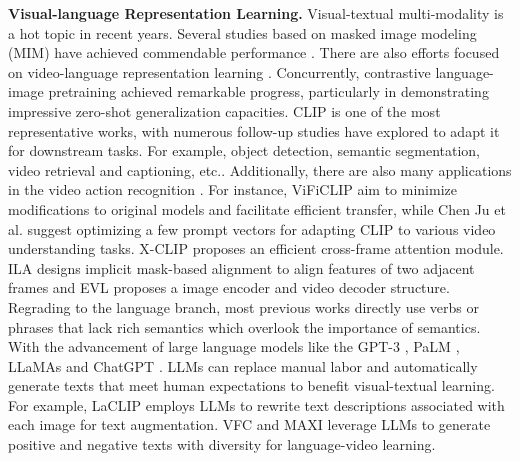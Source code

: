 \noindent
\textbf{Visual-language Representation Learning.} Visual-textual multi-modality is a hot topic in recent years. Several studies based on masked image modeling (MIM) have achieved commendable performance \cite{li2020unicoder,lu2019vilbert,su2019vl,tan2019lxmert}. There are also efforts focused on video-language representation learning \cite{miech2019howto100m,sun2019learning,sun2019videobert,zhu2020actbert,xu2021videoclip}. Concurrently, contrastive language-image pretraining \cite{radford2021learning,jia2021scaling,yuan2021florence} achieved remarkable progress, particularly in demonstrating impressive zero-shot generalization capacities. CLIP \cite{radford2021learning} is one of the most representative works, with numerous follow-up studies have explored to adapt it for downstream tasks. For example, object detection, semantic segmentation, video retrieval and captioning, etc.\cite{gu2021open,vinker2022clipasso,li2022grounded,luo2022clip4clip,xu2022groupvit}. Additionally, there are also many applications in the video action recognition \cite{wang2021actionclip,ni2022expanding,lin2022frozen,ju2022prompting,pan2022st,rasheed2023fine,chen2023video,tu2023implicit,lin2023match,momeni2023verbs,yang2023aim}. For instance, ViFiCLIP \cite{rasheed2023fine} aim to minimize modifications to original models and facilitate efficient transfer, while Chen Ju et al. \cite{ju2022prompting} suggest optimizing a few prompt vectors for adapting CLIP to various video understanding tasks. X-CLIP \cite{ni2022expanding} proposes an efficient cross-frame attention module. ILA \cite{tu2023implicit} designs implicit mask-based alignment to align features of two adjacent frames and EVL \cite{lin2022frozen} proposes a image encoder and video decoder structure. Regrading to the language branch, most previous works directly use verbs or phrases that lack rich semantics which overlook the importance of semantics. With the advancement of large language models like the GPT-3 \cite{brown2020language}, PaLM \cite{chowdhery2023palm}, LLaMAs \cite{touvron2023llama,touvron2023llama2,dubey2024llama3herdmodels} and ChatGPT \cite{openai2024gpt4technicalreport}. LLMs can replace manual labor \cite{chen2021elaborative,qian2022rethinking} and automatically generate texts that meet human expectations to benefit visual-textual learning. For example, LaCLIP \cite{fan2024improving} employs LLMs to rewrite text descriptions associated with each image for text augmentation. VFC \cite{momeni2023verbs} and MAXI \cite{lin2023match} leverage LLMs to generate positive and negative texts with diversity for language-video learning. 

